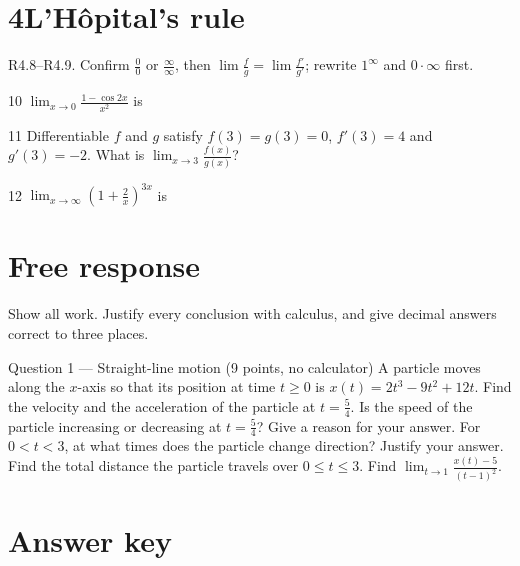 \documentclass{apcalc}
\begin{document}
\section*{4\quad L'Hôpital's rule}
\begin{setrule}R4.8–R4.9. Confirm $\frac00$ or $\frac\infty\infty$, then $\lim\frac fg=\lim\frac{f'}{g'}$; rewrite $1^\infty$ and $0\cdot\infty$ first.\end{setrule}
\begin{q}{10}
$\displaystyle\lim_{x\to0}\frac{1-\cos 2x}{x^2}$ is
\end{q}
\begin{q}{11}
Differentiable $f$ and $g$ satisfy $f(3)=g(3)=0$, $f'(3)=4$ and $g'(3)=-2$. What is $\displaystyle\lim_{x\to3}\frac{f(x)}{g(x)}$?
\end{q}
\begin{q}{12}
$\displaystyle\lim_{x\to\infty}\left(1+\frac2x\right)^{3x}$ is
\end{q}
\clearpage\section*{Free response}
Show all work. Justify every conclusion with calculus, and give decimal answers correct to three places.
\begin{frq}{Question 1 --- Straight-line motion (9 points, no calculator)}
A particle moves along the $x$-axis so that its position at time $t\ge0$ is $x(t)=2t^3-9t^2+12t$.
Find the velocity and the acceleration of the particle at $t=\frac54$. Is the speed of the particle increasing or decreasing at $t=\frac54$? Give a reason for your answer.\workspace{1.6in}
For $0<t<3$, at what times does the particle change direction? Justify your answer.\workspace{1.6in}
Find the total distance the particle travels over $0\le t\le3$.\workspace{1.6in}
Find $\displaystyle\lim_{t\to1}\frac{x(t)-5}{(t-1)^2}$.\workspace{1.6in}
\end{frq}
\clearpage\section*{Answer key}
\vspace{4pt}
\end{document}
